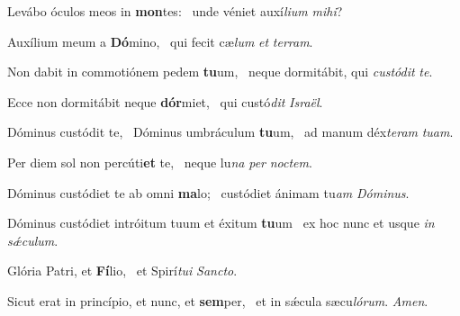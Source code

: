 \item Levábo óculos meos in \textbf{mon}tes:~\psstar{} unde véniet auxí\textit{lium} \textit{mihi}?

\item Auxílium meum a \textbf{Dó}mino,~\psstar{} qui fecit cæ\textit{lum} \textit{et} \textit{terram}.

\item Non dabit in commotiónem pedem \textbf{tu}um,~\psstar{} neque dormitábit, qui \textit{custódit} \textit{te}.

\item Ecce non dormitábit neque \textbf{dór}miet,~\psstar{} qui custó\textit{dit} \textit{Israël}.

\item Dóminus custódit te,~\pscross{} Dóminus umbráculum \textbf{tu}um,~\psstar{} ad manum déx\textit{teram} \textit{tuam}.

\item Per diem sol non percúti\textbf{et} te,~\psstar{} neque lu\textit{na} \textit{per} \textit{noctem}.

\item Dóminus custódiet te ab omni \textbf{ma}lo;~\psstar{} custódiet ánimam tu\textit{am} \textit{Dóminus}.

\item Dóminus custódiet intróitum tuum et éxitum \textbf{tu}um~\psstar{} ex hoc nunc et usque \textit{in} \textit{sǽculum}.

\item Glória Patri, et \textbf{Fí}lio,~\psstar{} et Spirí\textit{tui} \textit{Sancto}.

\item Sicut erat in princípio, et nunc, et \textbf{sem}per,~\psstar{} et in sǽcula sæcu\textit{lórum}. \textit{Amen}.